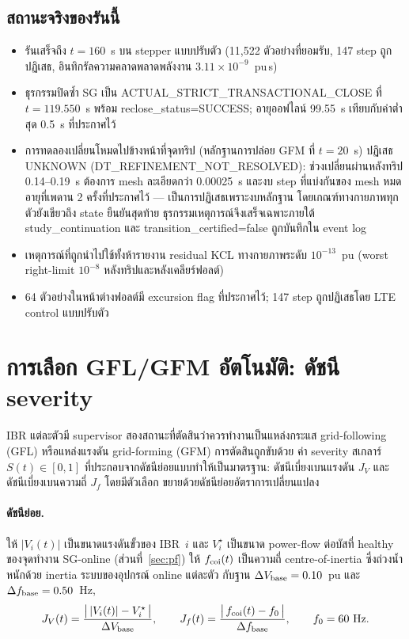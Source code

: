 \documentclass[12pt,a4paper]{article}
\newcommand{\code}[1]{{\ttfamily\small\hyphenchar\font=-1 #1}}
\begin{document}
\subsection{สถานะจริงของรันนี้}
\begin{itemize}
\item รันเสร็จถึง $t=160$~s บน stepper แบบปรับตัว (11{,}522 ตัวอย่างที่ยอมรับ,
      147 step ถูกปฏิเสธ, อินทิกรัลความคลาดพลาดพลังงาน $3.11\times10^{-9}$~pu\,s)
\item ธุรกรรมปิดซ้ำ SG เป็น \code{ACTUAL\_STRICT\_TRANSACTIONAL\_CLOSE} ที่ $t=119.550$~s
      พร้อม \code{reclose\_status=SUCCESS}; อายุออฟไลน์ 99.55~s เทียบกับค่าต่ำสุด
      0.5~s ที่ประกาศไว้
\item การทดลองเปลี่ยนโหมดไปข้างหน้าที่จุดทริป (หลักฐานการปล่อย GFM ที่ $t=20$~s)
      ปฏิเสธ \code{UNKNOWN (DT\_REFINEMENT\_NOT\_RESOLVED)}: ช่วงเปลี่ยนผ่านหลังทริป
      0.14--0.19~s ต้องการ mesh ละเอียดกว่า 0.00025~s และงบ step ที่แบ่งกันของ
      mesh หมดอายุที่เพดาน 2 ครั้งที่ประกาศไว้ --- เป็นการปฏิเสธเพราะงบหลักฐาน
      โดยเกณฑ์ทางกายภาพทุกตัวยังเขียวถึง state ยืนยันสุดท้าย
      ธุรกรรมเหตุการณ์จึงเสร็จเฉพาะภายใต้ \code{study\_continuation}
      และ \code{transition\_certified=false} ถูกบันทึกใน event log
\item เหตุการณ์ที่ถูกนำไปใช้ทั้งห้ารายงาน residual KCL ทางกายภาพระดับ $10^{-13}$~pu
      (worst right-limit $10^{-8}$ หลังทริปและหลังเคลียร์ฟอลต์)
\item 64 ตัวอย่างในหน้าต่างฟอลต์มี excursion flag ที่ประกาศไว้;
      147 step ถูกปฏิเสธโดย LTE control แบบปรับตัว
\end{itemize}

\section{การเลือก GFL/GFM อัตโนมัติ: ดัชนี severity}\label{sec:sev}

IBR แต่ละตัวมี supervisor สองสถานะที่ตัดสินว่าควรทำงานเป็นแหล่งกระแส
grid-following (GFL) หรือแหล่งแรงดัน grid-forming (GFM) การตัดสินถูกขับด้วย
ค่า severity สเกลาร์ $S(t)\in[0,1]$ ที่ประกอบจากดัชนีย่อยแบบทำให้เป็นมาตรฐาน:
ดัชนีเบี่ยงเบนแรงดัน $J_V$ และดัชนีเบี่ยงเบนความถี่ $J_f$ โดยมีตัวเลือก
ขยายด้วยดัชนีย่อยอัตราการเปลี่ยนแปลง

\paragraph{ดัชนีย่อย.}
ให้ $|V_i(t)|$ เป็นขนาดแรงดันขั้วของ IBR~$i$ และ $V_i^{\star}$ เป็นขนาด
power-flow ต่อบัสที่ healthy ของจุดทำงาน SG-online (ส่วนที่~\ref{sec:pf})
ให้ $f_{\rm coi}(t)$ เป็นความถี่ centre-of-inertia ซึ่งถ่วงน้ำหนักด้วย
inertia ระบบของอุปกรณ์ online แต่ละตัว กับฐาน $\Delta V_{\rm base}=0.10$~pu
และ $\Delta f_{\rm base}=0.50$~Hz,
\begin{equation}
  J_V(t)=\frac{\bigl|\,|V_i(t)|-V_i^{\star}\,\bigr|}{\Delta V_{\rm base}},
  \qquad
  J_f(t)=\frac{\bigl|\,f_{\rm coi}(t)-f_0\,\bigr|}{\Delta f_{\rm base}},
  \qquad f_0=60~\mathrm{Hz}.
  \label{eq:jvjf}
\end{equation}
\end{document}
